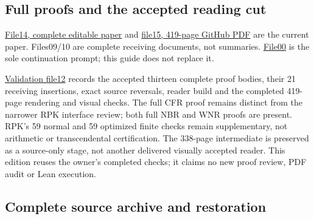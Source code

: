 \documentclass[
]{article}
\begin{document}
\subsection{Full proofs and the accepted reading
cut}\label{full-proofs-and-the-accepted-reading-cut}

\href{https://github.com/KokunoYumeto/zeta-function-research-reader/blob/0512b18d5479f3abc24ae654f8ffee4e5d53922e/workbenches/splitzero-tandem/continuations/20260915-native-boundary-continuation/14_CURRENT_KERNEL_AND_MULTIPLICITY_PROOFS.tex}{File14,
complete editable paper} and
\href{https://github.com/KokunoYumeto/zeta-function-research-reader/blob/0512b18d5479f3abc24ae654f8ffee4e5d53922e/workbenches/splitzero-tandem/continuations/20260915-native-boundary-continuation/15_CURRENT_MIXED_CONTROL_READER.pdf}{file15,
419-page GitHub PDF} are the current paper. Files09/10 are complete
receiving documents, not summaries.
\href{https://github.com/KokunoYumeto/zeta-function-research-reader/blob/0512b18d5479f3abc24ae654f8ffee4e5d53922e/workbenches/splitzero-tandem/continuations/20260915-native-boundary-continuation/00_CONTINUE_HERE.md}{File00}
is the sole continuation prompt; this guide does not replace it.

\href{https://github.com/KokunoYumeto/zeta-function-research-reader/blob/0512b18d5479f3abc24ae654f8ffee4e5d53922e/workbenches/splitzero-tandem/continuations/20260915-native-boundary-continuation/12_VALIDATION.md}{Validation
file12} records the accepted thirteen complete proof bodies, their 21
receiving insertions, exact source reversals, reader build and the
completed 419-page rendering and visual checks. The full CFR proof
remains distinct from the narrower RPK interface review; both full NBR
and WNR proofs are present. RPK's 59 normal and 59 optimized finite
checks remain supplementary, not arithmetic or transcendental
certification. The 338-page intermediate is preserved as a source-only
stage, not another delivered visually accepted reader. This edition
reuses the owner's completed checks; it claims no new proof review, PDF
audit or Lean execution.

\subsection{Complete source archive and
restoration}\label{complete-source-archive-and-restoration}
\end{document}
